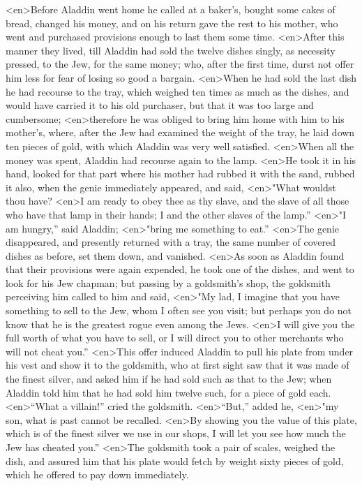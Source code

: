 <en>Before Aladdin went home he called at a baker’s, bought some cakes of bread, changed his money, and on his return gave the rest to his mother, who went and purchased provisions enough to last them some time.
<en>After this manner they lived, till Aladdin had sold the twelve dishes singly, as necessity pressed, to the Jew, for the same money; who, after the first time, durst not offer him less for fear of losing so good a bargain.
<en>When he had sold the last dish he had recourse to the tray, which weighed ten times as much as the dishes, and would have carried it to his old purchaser, but that it was too large and cumbersome;
<en>therefore he was obliged to bring him home with him to his mother’s, where, after the Jew had examined the weight of the tray, he laid down ten pieces of gold, with which Aladdin was very well satisfied.
<en>When all the money was spent, Aladdin had recourse again to the lamp.
<en>He took it in his hand, looked for that part where his mother had rubbed it with the sand, rubbed it also, when the genie immediately appeared, and said,
<en>"What wouldst thou have?
<en>I am ready to obey thee as thy slave, and the slave of all those who have that lamp in their hands; I and the other slaves of the lamp.”
<en>"I am hungry,” said Aladdin;
<en>"bring me something to eat.”
<en>The genie disappeared, and presently returned with a tray, the same number of covered dishes as before, set them down, and vanished.
<en>As soon as Aladdin found that their provisions were again expended, he took one of the dishes, and went to look for his Jew chapman; but passing by a goldsmith’s shop, the goldsmith perceiving him called to him and said,
<en>"My lad, I imagine that you have something to sell to the Jew, whom I often see you visit; but perhaps you do not know that he is the greatest rogue even among the Jews.
<en>I will give you the full worth of what you have to sell, or I will direct you to other merchants who will not cheat you.”
<en>This offer induced Aladdin to pull his plate from under his vest and show it to the goldsmith, who at first sight saw that it was made of the finest silver, and asked him if he had sold such as that to the Jew; when Aladdin told him that he had sold him twelve such, for a piece of gold each.
<en>“What a villain!” cried the goldsmith.
<en>“But,” added he,
<en>"my son, what is past cannot be recalled.
<en>By showing you the value of this plate, which is of the finest silver we use in our shops, I will let you see how much the Jew has cheated you.”
<en>The goldsmith took a pair of scales, weighed the dish, and assured him that his plate would fetch by weight sixty pieces of gold, which he offered to pay down immediately.
